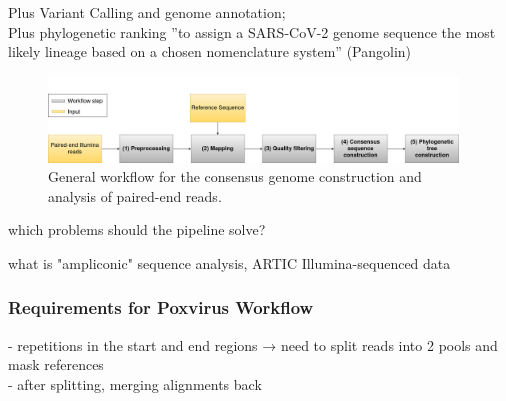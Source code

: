 Plus Variant Calling and genome annotation; \\
Plus phylogenetic ranking ''to assign a SARS-CoV-2 genome sequence the most likely lineage based on a chosen nomenclature system'' (Pangolin)

\begin{figure}[H]
	\centering
	\includegraphics[width=0.97\textwidth]{media/general.jpg}
	\caption{General workflow for the consensus genome construction and analysis of paired-end reads.} 
	\label{fig:3-general-wf}
\end{figure}

which problems should the pipeline solve?

what is "ampliconic" sequence analysis, ARTIC Illumina-sequenced data

\subsubsection{Requirements for Poxvirus Workflow}
- repetitions in the start and end regions → need to split reads into 2 pools and mask references \\
- after splitting, merging alignments back 

